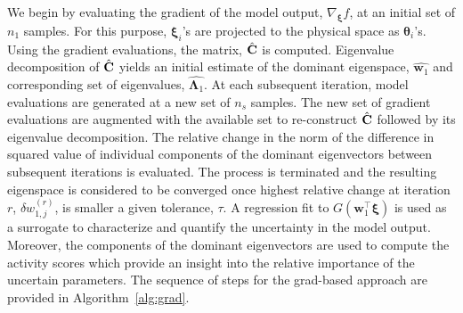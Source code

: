 We begin by evaluating the gradient of the model output, $\nabla_{\bm{\xi}}f$, at an initial set of $n_1$ samples. 
For this purpose, $\bm{\xi}_i$'s are projected to the physical space as $\bm{\theta}_i$'s. Using the gradient
evaluations, the matrix, $\hat{\mathbf{{C}}}$ is computed. Eigenvalue decomposition of $\hat{\mathbf{{C}}}$ yields an initial
estimate of the dominant eigenspace, $\hat{\bm{w}_1}$ and corresponding set of eigenvalues, $\hat{\bm{\Lambda}_1}$.
At each subsequent iteration, model evaluations are generated at a new set of $n_s$ samples. The new set
of gradient evaluations are augmented with the available set to re-construct $\hat{\mathbf{{C}}}$ followed by its eigenvalue
decomposition. The relative
change in the norm of the difference in squared value of individual components of the dominant eigenvectors between subsequent 
iterations is evaluated. The process is terminated and the resulting eigenspace is considered to be converged once
highest relative change at iteration $r$, $\delta w_{1,j}^{(r)}$, is smaller a given tolerance, $\tau$. A regression fit to
 $G(\bm{w}_1^\top\bm{\xi})$ is used as a surrogate to characterize and quantify the uncertainty in the model
 output. Moreover, the components of the dominant eigenvectors are used to compute the activity scores which
 provide an insight into the relative importance of the uncertain parameters. The sequence of steps for the grad-based
 approach are provided in Algorithm~\ref{alg:grad}.


